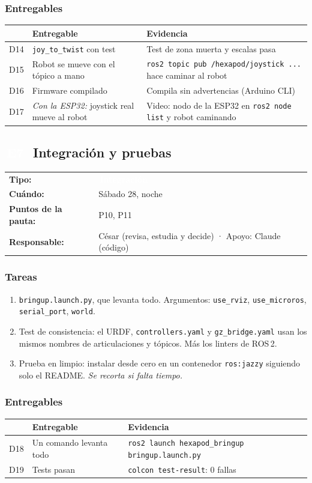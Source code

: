\documentclass[11pt,a4paper]{article}
\makeatletter
\newcommand{\pill}[2]{{\setlength{\fboxsep}{1.6pt}\colorbox{#1}{\textcolor{white}{\footnotesize\bfseries\,#2\,}}}}
\newcommand{\Esi}{\pill{cInteg}{E7}}
\newcommand{\ficha}[4]{%
  \begin{tabularx}{\linewidth}{@{}l Y@{}}
  \textbf{Tipo:} & \pill{#1}{#2}\\
  \textbf{Cuándo:} & #3\\
  \textbf{Puntos de la pauta:} & #4\\
  \textbf{Responsable:} & César (revisa, estudia y decide) · Apoyo: Claude (código)\\
  \end{tabularx}\par}
\makeatother
\begin{document}
\subsubsection{Entregables}
\begin{tabularx}{\linewidth}{@{}l Y Y@{}}
\toprule \textbf{} & \textbf{Entregable} & \textbf{Evidencia}\\ \midrule
D14 & \texttt{joy\_to\_twist} con test & Test de zona muerta y escalas pasa\\
D15 & Robot se mueve con el tópico a mano & \texttt{ros2 topic pub /hexapod/joystick ...} hace caminar al robot\\
D16 & Firmware compilado & Compila sin advertencias (Arduino CLI)\\
D17 & \emph{Con la ESP32:} joystick real mueve al robot & Video: nodo de la ESP32 en \texttt{ros2 node list} y robot caminando\\
\bottomrule
\end{tabularx}

\subsection{\texorpdfstring{\Esi\ }{E7 }Integración y pruebas}
\ficha{cInteg}{Integración}{Sábado 28, noche}{P10, P11}

\subsubsection{Tareas}
\begin{enumerate}[label=T\arabic*]
  \item \texttt{bringup.launch.py}, que levanta todo. Argumentos: \texttt{use\_rviz}, \texttt{use\_microros}, \texttt{serial\_port}, \texttt{world}.
  \item Test de consistencia: el URDF, \texttt{controllers.yaml} y \texttt{gz\_bridge.yaml} usan los mismos nombres de articulaciones y tópicos. Más los linters de ROS\,2.
  \item Prueba en limpio: instalar desde cero en un contenedor \texttt{ros:jazzy} siguiendo solo el README. \emph{Se recorta si falta tiempo.}
\end{enumerate}

\subsubsection{Entregables}
\begin{tabularx}{\linewidth}{@{}l Y Y@{}}
\toprule \textbf{} & \textbf{Entregable} & \textbf{Evidencia}\\ \midrule
D18 & Un comando levanta todo & \texttt{ros2 launch hexapod\_bringup bringup.launch.py}\\
D19 & Tests pasan & \texttt{colcon test-result}: 0 fallas\\
\bottomrule
\end{tabularx}
\end{document}
